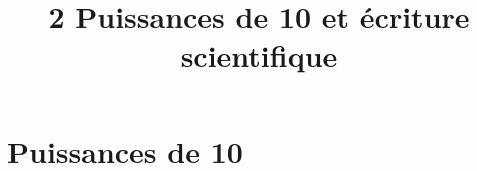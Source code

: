 \documentclass[12pt,a4paper]{article}
\date{}
\title{\textcircled{{\normalsize{2}}} Puissances de 10 et écriture scientifique}
\begin{document}
	
	\maketitle

\vspace*{-0.5cm}



%
%
%
%
%
%

\vspace*{-0.5cm}
 
\section{Puissances de 10}


\end{document}
